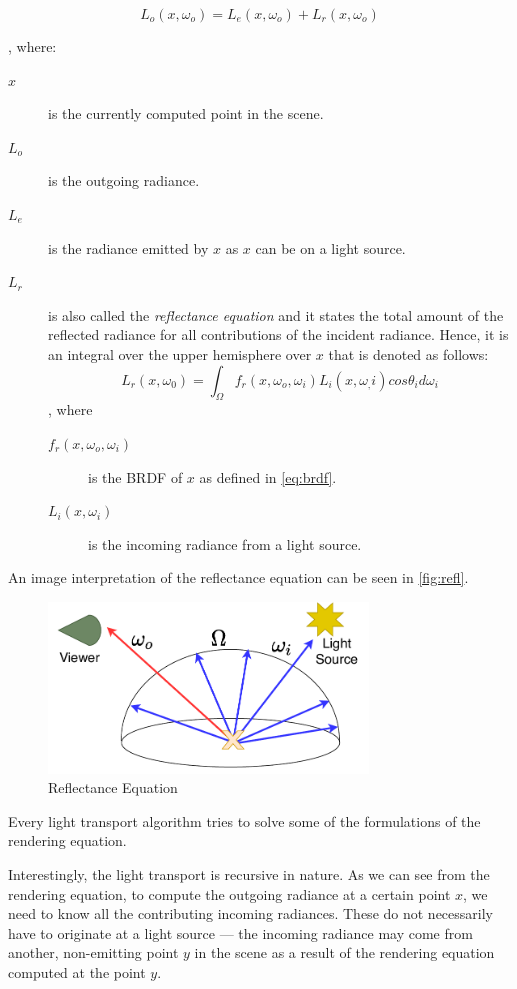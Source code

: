 \begin{equation}
L_o(x,\omega_o)=L_e(x,\omega_o)+L_r(x,\omega_o)
\end{equation}

, where:
\begin{description}
	\item[$x$] is the currently computed point in the scene.
	\item[$L_o$] is the outgoing radiance.
	\item[$L_e$] is the radiance emitted by $x$ as $x$ can be on a light source.
	\item[$L_r$] is also called the \emph{reflectance equation} and it states the total amount of the reflected radiance for all contributions of the incident radiance. Hence, it is an integral over the upper hemisphere over $x$ that is denoted as follows:
	\begin{equation}
	L_r(x,\omega_0)=\int_{\Omega}f_r(x,\omega_o,\omega_i) L_i(x,\omega_,i) cos\theta_i d\omega_i
	\end{equation}
	, where
	\begin{description}
		\item[$f_r(x,\omega_o,\omega_i)$] is the BRDF of $x$ as defined in \autoref{eq:brdf}.
		\item[$L_i(x,\omega_i)$] is the incoming radiance from a light source.
	\end{description}
\end{description}

An image interpretation of the reflectance equation can be seen in \autoref{fig:refl}.

\begin{figure}[h]
	\centering
	\includegraphics[width=85mm]{img/refl.pdf}
	\caption{Reflectance Equation}
	\label{fig:refl}
\end{figure}

Every light transport algorithm tries to solve some of the formulations of the rendering equation.

Interestingly, the light transport is recursive in nature. As we can see from the rendering equation, to compute the outgoing radiance at a certain point $x$, we need to know all the contributing incoming radiances. These do not necessarily have to originate at a light source --- the incoming radiance may come from another, non-emitting point $y$ in the scene as a result of the rendering equation computed at the point $y$.

